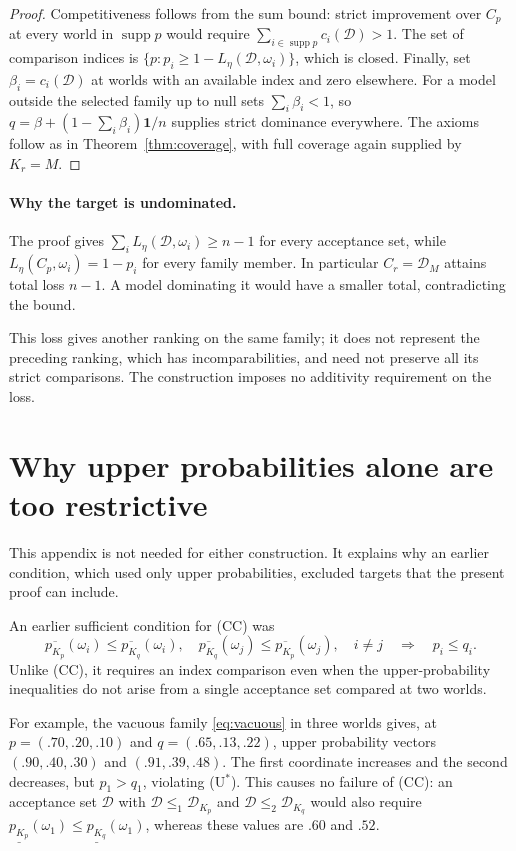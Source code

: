 \documentclass[11pt]{article}
\theoremstyle{remark}
\newcommand{\one}{\mathbf 1}
\newcommand{\supp}{\operatorname{supp}}
\newcommand{\Dscr}{\mathcal D}
\newcommand{\lowprob}[1]{\underline{p_{#1}}}
\newcommand{\upprob}[1]{\overline{p_{#1}}}
\begin{document}
\begin{proof}
Competitiveness follows from the sum bound: strict improvement over $C_{p}$ at
every world in $\supp p$ would require $\sum_{i\in\supp p}c_i(\Dscr)>1$.
The set of comparison indices is $\{p:p_i\ge1-L_\eta(\Dscr,\omega_i)\}$, which is closed.
Finally, set $\beta_i=c_i(\Dscr)$ at worlds with an available index and zero elsewhere.
For a model outside the selected family up to null sets $\sum_i\beta_i<1$, so
$q=\beta+(1-\sum_i\beta_i)\one/n$ supplies strict dominance everywhere.
The axioms follow as in Theorem~\ref{thm:coverage}, with full coverage again
supplied by $K_r=M$.
\end{proof}

\paragraph{Why the target is undominated.}
The proof gives $\sum_i L_\eta(\Dscr,\omega_i)\ge n-1$ for every acceptance
set, while $L_\eta(C_p,\omega_i)=1-p_i$ for every family member.
In particular $C_r=\Dscr_M$ attains total loss $n-1$.
A model dominating it would have a smaller total, contradicting the bound.

This loss gives another ranking on the same family; it does not represent the
preceding ranking, which has incomparabilities, and need not preserve all its
strict comparisons. The construction imposes no additivity requirement on the loss.

\appendix
\section{Why upper probabilities alone are too restrictive}\label{app:ustar}

This appendix is not needed for either construction. It explains why an earlier
condition, which used only upper probabilities, excluded targets that the
present proof can include.

An earlier sufficient condition for (CC) was
\begin{equation*}
 \upprob{K_p}(\omega_i)\le\upprob{K_q}(\omega_i),\quad
 \upprob{K_q}(\omega_j)\le\upprob{K_p}(\omega_j),\quad i\ne j
 \quad\Longrightarrow\quad p_i\le q_i.
 \tag{U$^*$}\label{eq:ustar}
\end{equation*}
Unlike (CC), it requires an index comparison even when the upper-probability
inequalities do not arise from a single acceptance set compared at two worlds.

For example, the vacuous family \eqref{eq:vacuous} in three worlds gives,
at $p=(.70,.20,.10)$ and $q=(.65,.13,.22)$, upper probability vectors
$(.90,.40,.30)$ and $(.91,.39,.48)$. The first coordinate increases and the
second decreases, but $p_1>q_1$, violating (U$^*$). This causes no failure
of (CC): an acceptance set $\Dscr$ with $\Dscr\le_1\Dscr_{K_p}$ and
$\Dscr\le_2\Dscr_{K_q}$ would also require
$\lowprob{K_p}(\omega_1)\le\lowprob{K_q}(\omega_1)$, whereas these values are $.60$ and $.52$.
\end{document}
